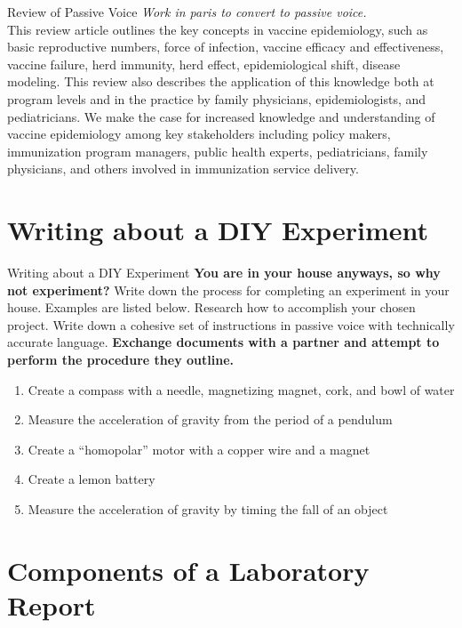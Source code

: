 \documentclass{beamer}
\begin{document}
\begin{frame}{Review of Passive Voice}
\textit{\alert{Work in paris to convert to passive voice.}} \\
This review article outlines the key concepts in vaccine epidemiology, such as basic reproductive numbers, force of infection, vaccine efficacy and effectiveness, vaccine failure, herd immunity, herd effect, epidemiological shift, disease modeling.  This review also describes the application of this knowledge both at program levels and in the practice by family physicians, epidemiologists, and pediatricians. We make the case for increased knowledge and understanding of vaccine epidemiology among key stakeholders including policy makers, immunization program managers, public health experts, pediatricians, family physicians, and others involved in immunization service delivery.
\end{frame}

\section{Writing about a DIY Experiment}

\begin{frame}{Writing about a DIY Experiment}
\small
\textbf{\alert{You are in your house anyways, so why not experiment?}} Write down the process for completing an experiment in your house.  Examples are listed below.  Research how to accomplish your chosen project.  Write down a cohesive set of instructions in passive voice with technically accurate language.  \textbf{Exchange documents with a partner and attempt to perform the procedure they outline.}
\begin{enumerate}
\item Create a compass with a needle, magnetizing magnet, cork, and bowl of water
\item Measure the acceleration of gravity from the period of a pendulum
\item Create a ``homopolar'' motor with a copper wire and a magnet
\item Create a lemon battery
\item Measure the acceleration of gravity by timing the fall of an object
\end{enumerate}
\end{frame}

\section{Components of a Laboratory Report}
\end{document}
